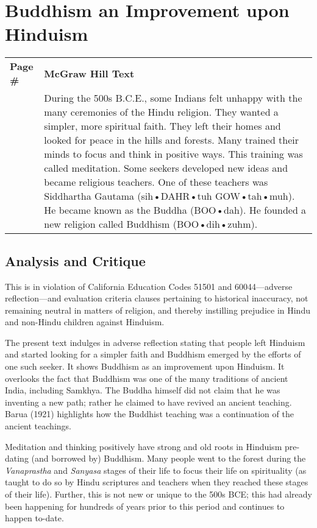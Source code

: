 \chapter{Buddhism an Improvement upon Hinduism}

\begin{longtable}{|>{\raggedleft}p{1.5cm}|p{8.5cm}|}
\multicolumn{2}{c}{\textbf{Table: 1}}\\ 
\hline
\textbf{Page \#} & \textbf{McGraw Hill Text} \tabularnewline
\hline 
264 & During the 500s B.C.E., some Indians felt unhappy with the many ceremonies of the Hindu religion. They wanted a simpler, more spiritual faith. They left their homes and looked for peace in the hills and forests. Many trained their minds to focus and think in positive ways. This training was called meditation. Some seekers developed new ideas and became religious teachers. One of these teachers was Siddhartha Gautama (sih•DAHR•tuh GOW•tah•muh). He became known as the Buddha (BOO•dah). He founded a new religion called Buddhism (BOO•dih•zuhm).\tabularnewline
\hline
\end{longtable}

\section*{Analysis and Critique} 

This is in violation of California Education Codes 51501 and 60044—adverse reflection—and evaluation criteria clauses pertaining to historical inaccuracy, not remaining neutral in matters of religion, and thereby instilling prejudice in Hindu and non-Hindu children against Hinduism.

The present text indulges in adverse reflection stating that people left Hinduism and started looking for a simpler faith and Buddhism emerged by the efforts of one such seeker. It shows Buddhism as an improvement upon Hinduism. It overlooks the fact that Buddhism was one of the many traditions of ancient India, including Samkhya. The Buddha himself did not claim that he was inventing a new path; rather he claimed to have revived an ancient teaching. Barua (1921) highlights how the Buddhist teaching was a continuation of the ancient teachings. 

Meditation and thinking positively have strong and old roots in Hinduism pre-dating (and borrowed by) Buddhism. Many people went to the forest during the \textit{Vanaprastha} and \textit{Sanyasa} stages of their life to focus their life on spirituality (as taught to do so by Hindu scriptures and teachers when they reached these stages of their life). Further, this is not new or unique to the 500s BCE; this had already been happening for hundreds of years prior to this period and continues to happen to-date.


